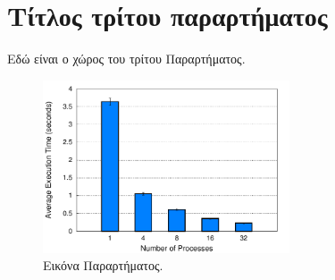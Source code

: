 \chapter{Τίτλος τρίτου παραρτήματος}
\label{app:ThirdAppendix}

Εδώ είναι ο χώρος του τρίτου Παραρτήματος.

\begin{figure}[h]
	\centering
	\includegraphics[width=0.65\textwidth]{Figures/MatrixMultiplication.pdf}
	\caption{Εικόνα Παραρτήματος.}
	\label{fig:AppendixFigure}
\end{figure}